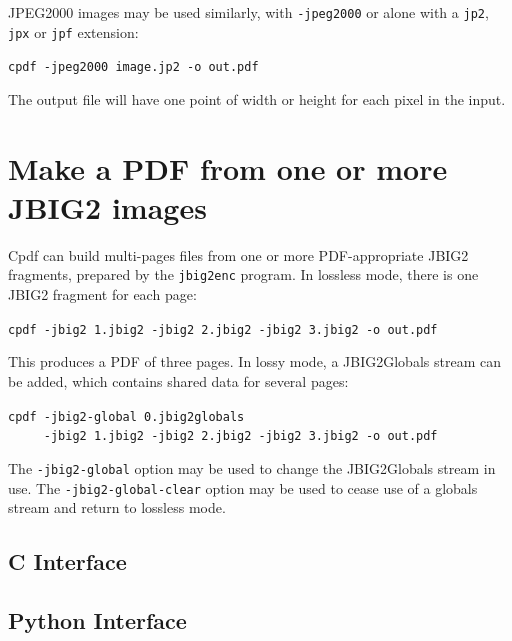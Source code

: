 \documentclass{book}
\begin{document}
\noindent JPEG2000 images may be used similarly, with \texttt{-jpeg2000} or alone with a \texttt{jp2}, \texttt{jpx} or \texttt{jpf} extension:

\begin{framed}
 \noindent\small\verb?cpdf -jpeg2000 image.jp2 -o out.pdf?
\end{framed}

\noindent The output file will have one point of width or height for each pixel in the input.

\section{Make a PDF from one or more JBIG2 images}

Cpdf can build multi-pages files from one or more PDF-appropriate JBIG2 fragments, prepared by the \texttt{jbig2enc} program. In lossless mode, there is one JBIG2 fragment for each page:

\begin{framed}
 \noindent\small\verb?cpdf -jbig2 1.jbig2 -jbig2 2.jbig2 -jbig2 3.jbig2 -o out.pdf?
\end{framed}

\noindent This produces a PDF of three pages. In lossy mode, a JBIG2Globals stream can be added, which contains shared data for several pages:

\begin{framed}
 \noindent\small\verb?cpdf -jbig2-global 0.jbig2globals?\\
 \noindent\small\verb!     -jbig2 1.jbig2 -jbig2 2.jbig2 -jbig2 3.jbig2 -o out.pdf!
\end{framed}

\noindent The \texttt{-jbig2-global} option may be used to change the JBIG2Globals stream in use. The \texttt{-jbig2-global-clear} option may be used to cease use of a globals stream and return to lossless mode.

\begin{cpdflib}
\clearpage
\section*{C Interface}
\begin{small}\tt

\end{small}
\end{cpdflib}

\begin{pycpdflib}
\clearpage
\section*{Python Interface}
\begin{small}\tt

\end{small}
\end{pycpdflib}
\end{document}
